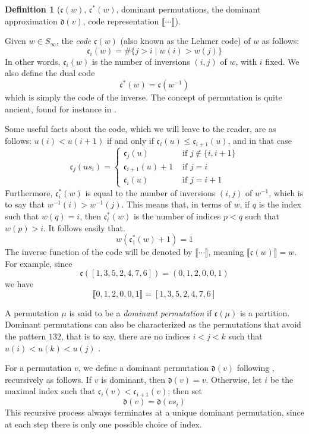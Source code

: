 \documentclass[reqno]{amsart}
\theoremstyle{definition}
\newtheorem{definition}[lemma]{Definition}
\theoremstyle{remark}
\numberwithin{equation}{subsection}
\newcommand{\cperm}[1]{\llbracket #1\rrbracket}
\newcommand{\dom}{\mathfrak{d}}
\newcommand{\code}{\mathfrak{c}}
\begin{document}
	\begin{definition}[$\mathfrak{c}(w)$, $\mathfrak{c}^*(w)$, dominant permutations, the dominant approximation $\dom(v)$, code representation $\cperm{\cdots}$] \label{definition:codestuff}
		
        Given $w\in S_\infty$, the \emph{code} $\code(w)$ (also known as the Lehmer code) of $w$ as follows:
		$$\code_i(w)=\#\{j> i\mid w(i)>w(j)\}$$
		In other words, $\code_i(w)$ is the number of inversions $(i,j)$ of $w$, with $i$ fixed. We also define the dual code
		$$\code^*(w)=\code(w^{-1})$$
		which is simply the code of the inverse. The concept of permutation is quite ancient, found for instance in \cite{laisant1888numeration}.
		
		Some useful facts about the code, which we will leave to the reader, are as follows: $u(i)<u(i+1)$ if and only if $\code_i(u)\leq\code_{i+1}(u)$, and in that case
		$$\code_j(us_i)=\begin{cases}
			\code_j(u)&\mbox{ if }j\notin \{i,i+1\}\\
			\code_{i+1}(u)+1&\mbox{ if }j=i\\
			\code_i(u)&\mbox{ if }j=i+1
		\end{cases}$$
		Furthermore, $\code^*_i(w)$ is equal to the number of inversions $(i,j)$ of $w^{-1}$, which is to say that $w^{-1}(i)>w^{-1}(j)$. This means that, in terms of $w$, if $q$ is the index such that $w(q)=i$, then $\code^*_i(w)$ is the number of indices $p<q$ such that $w(p)>i$. It follows easily that.
		$$w(\code^*_1(w)+1)=1$$
		The inverse function of the code will be denoted by $\cperm{\cdots}$, meaning $\cperm{\code(w)}=w$. For example, since
		$$\code([1,3,5,2,4,7,6]) = (0,1,2,0,0,1)$$
		we have
		$$\cperm{0,1,2,0,0,1}=[1,3,5,2,4,7,6]$$
		
		A permutation $\mu$ is said to be a \emph{dominant permutation} if $\code(\mu)$ is a partition. Dominant permutations can also be characterized as the permutations that avoid the pattern $132$, that is to say, there are no indices $i<j<k$ such that $u(i)<u(k)<u(j)$ \cite{reif}.
		
		For a permutation $v$, we define a dominant permutation $\dom(v)$ following \cite{samuelmolev}, recursively as follows. If $v$ is dominant, then $\dom(v)=v$. Otherwise, let $i$ be the maximal index such that $\code_i(v)<\code_{i+1}(v)$; then set
		$$\dom(v)=\dom(vs_i)$$
		This recursive process always terminates at a unique dominant permutation, since at each step there is only one possible choice of index.
	\end{definition}
	
\end{document}
